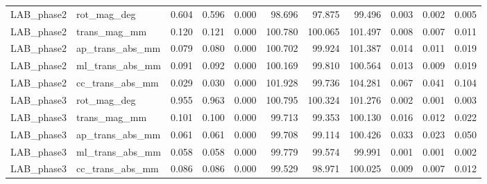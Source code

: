 \begin{tabular}{llrrrrrrrrr}
LAB\_phase2 & rot\_mag\_deg & 0.604 & 0.596 & 0.000 & 98.696 & 97.875 & 99.496 & 0.003 & 0.002 & 0.005 \\
LAB\_phase2 & trans\_mag\_mm & 0.120 & 0.121 & 0.000 & 100.780 & 100.065 & 101.497 & 0.008 & 0.007 & 0.011 \\
LAB\_phase2 & ap\_trans\_abs\_mm & 0.079 & 0.080 & 0.000 & 100.702 & 99.924 & 101.387 & 0.014 & 0.011 & 0.019 \\
LAB\_phase2 & ml\_trans\_abs\_mm & 0.091 & 0.092 & 0.000 & 100.169 & 99.810 & 100.564 & 0.013 & 0.009 & 0.019 \\
LAB\_phase2 & cc\_trans\_abs\_mm & 0.029 & 0.030 & 0.000 & 101.928 & 99.736 & 104.281 & 0.067 & 0.041 & 0.104 \\
LAB\_phase3 & rot\_mag\_deg & 0.955 & 0.963 & 0.000 & 100.795 & 100.324 & 101.276 & 0.002 & 0.001 & 0.003 \\
LAB\_phase3 & trans\_mag\_mm & 0.101 & 0.100 & 0.000 & 99.713 & 99.353 & 100.130 & 0.016 & 0.012 & 0.022 \\
LAB\_phase3 & ap\_trans\_abs\_mm & 0.061 & 0.061 & 0.000 & 99.708 & 99.114 & 100.426 & 0.033 & 0.023 & 0.050 \\
LAB\_phase3 & ml\_trans\_abs\_mm & 0.058 & 0.058 & 0.000 & 99.779 & 99.574 & 99.991 & 0.001 & 0.001 & 0.002 \\
LAB\_phase3 & cc\_trans\_abs\_mm & 0.086 & 0.086 & 0.000 & 99.529 & 98.971 & 100.025 & 0.009 & 0.007 & 0.012 \\
\bottomrule
\end{tabular}
